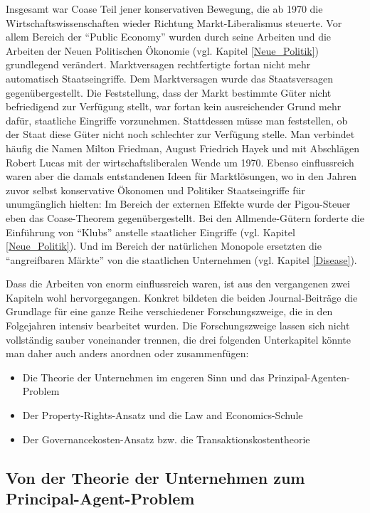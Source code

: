 Insgesamt war Coase Teil jener konservativen Bewegung, die ab 1970 die Wirtschaftswissenschaften wieder Richtung Markt-Liberalismus steuerte. Vor allem  Bereich der "`Public Economy"' wurden durch seine Arbeiten und die Arbeiten der Neuen Politischen Ökonomie (vgl. Kapitel \ref{Neue_Politik}) grundlegend verändert. Marktversagen rechtfertigte fortan nicht mehr automatisch Staatseingriffe. Dem Marktversagen wurde das Staatsversagen gegenübergestellt. Die Feststellung, dass der Markt bestimmte Güter nicht befriedigend zur Verfügung stellt, war fortan kein ausreichender Grund mehr dafür, staatliche Eingriffe vorzunehmen. Stattdessen müsse man feststellen, ob der Staat diese Güter nicht noch schlechter zur Verfügung stelle. Man verbindet häufig die Namen Milton Friedman, August Friedrich Hayek und mit Abschlägen Robert Lucas mit der wirtschaftsliberalen Wende um 1970. Ebenso einflussreich waren aber die damals entstandenen Ideen für Marktlösungen, wo in den Jahren zuvor selbst konservative Ökonomen und Politiker Staatseingriffe für unumgänglich hielten: Im Bereich der externen Effekte wurde der Pigou-Steuer eben das Coase-Theorem gegenübergestellt. Bei den Allmende-Gütern forderte \textcite{Buchanan1965} die Einführung von "`Klubs"' anstelle staatlicher Eingriffe (vgl. Kapitel \ref{Neue_Politik}). Und im Bereich der natürlichen Monopole ersetzten die "`angreifbaren Märkte"' von \textcite{Baumol1982} die staatlichen Unternehmen (vgl. Kapitel \ref{Disease}). 

Dass die Arbeiten von \textcite{Coase1937, Coase1960} enorm einflussreich waren, ist aus den vergangenen zwei Kapiteln wohl hervorgegangen. Konkret bildeten die beiden Journal-Beiträge die Grundlage für eine ganze Reihe verschiedener Forschungszweige, die in den Folgejahren intensiv bearbeitet wurden. Die Forschungszweige lassen sich nicht vollständig sauber voneinander trennen, die drei folgenden Unterkapitel könnte man daher auch anders anordnen oder zusammenfügen:
\begin{itemize}
	\item Die Theorie der Unternehmen im engeren Sinn und das Prinzipal-Agenten-Problem
	\item Der Property-Rights-Ansatz und die Law and Economics-Schule
	\item Der Governancekosten-Ansatz bzw. die Transaktionskostentheorie
\end{itemize}



\subsection{Von der Theorie der Unternehmen zum Principal-Agent-Problem}
\label{sec: Theorie_Unternehmen}

